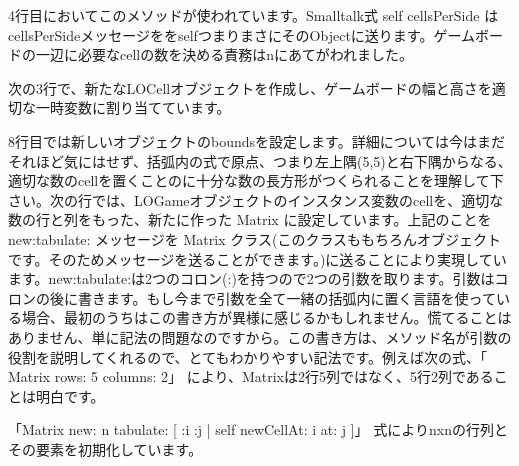 \documentclass[a4paper,10pt,twoside]{book}
\begin{document}
 
4行目においてこのメソッドが使われています。Smalltalk式 self cellsPerSide はcellsPerSideメッセージををselfつまりまさにそのObjectに送ります。ゲームボードの一辺に必要なcellの数を決める責務はnにあてがわれました。

次の3行で、新たなLOCellオブジェクトを作成し、ゲームボードの幅と高さを適切な一時変数に割り当てています。 

8行目では新しいオブジェクトのboundsを設定します。詳細については今はまだそれほど気にはせず、括弧内の式で原点、つまり左上隅(5,5)と右下隅からなる、適切な数のcellを置くことのに十分な数の長方形がつくられることを理解して下さい。次の行では、LOGameオブジェクトのインスタンス変数のcellを、適切な数の行と列をもった、新たに作った Matrix に設定しています。上記のことを new:tabulate: メッセージを Matrix クラス(このクラスももちろんオブジェクトです。そのためメッセージを送ることができます。)に送ることにより実現しています。new:tabulate:は2つのコロン(:)を持つので2つの引数を取ります。引数はコロンの後に書きます。もし今まで引数を全て一緒の括弧内に置く言語を使っている場合、最初のうちはこの書き方が異様に感じるかもしれません。慌てることはありません、単に記法の問題なのですから。この書き方は、メソッド名が引数の役割を説明してくれるので、とてもわかりやすい記法です。例えば次の式、「 Matrix rows: 5 columns: 2」 により、Matrixは2行5列ではなく、5行2列であることは明白です。

「Matrix new: n tabulate: [ :i :j | self newCellAt: i at: j ]」 式によりnxnの行列とその要素を初期化しています。 



\end{document}
